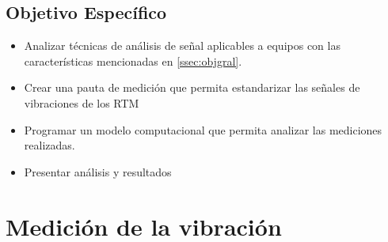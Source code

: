             \subsection{Objetivo Específico}
            \begin{itemize}
                \item Analizar técnicas de análisis de señal aplicables a equipos con las características mencionadas en \ref{ssec:objgral}.
                \item Crear una pauta de medición que permita estandarizar las señales de vibraciones de los RTM
                \item Programar un modelo computacional que permita analizar las mediciones realizadas.
                \item Presentar análisis y resultados            
            \end{itemize} 
    		\newpage
    \section{Medición de la vibración}

